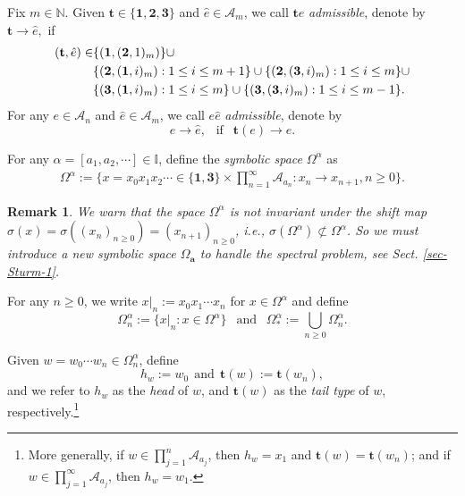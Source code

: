 \documentclass[reqno,11pt,graphicx,]{amsart}
\numberwithin{equation}{section}
\theoremstyle{plain}
\newcommand{\A}{{\mathscr A}}
\newcommand{\3}{\mathbf{3}}
\newcommand{\tT}{{\mathbf t}}
\newtheorem{remark}[theorem]{Remark}
\begin{document}
	Fix $m\in {\mathbb{N}}.$ Given ${\mathbf{t}}\in \{\mathbf{1},\mathbf{2},\mathbf{3}\}$ and $\hat e\in 
	\mathscr{A}_{m}$, we call ${\mathbf{t}}\hat e$ \textit{admissible}, denote
	by ${\mathbf{t}}\to \hat e,$ if 
	\begin{align}\label{admissible-T-A}
		({\mathbf{t}},\hat e)\in& \{(\mathbf{1},(\mathbf{2},1)_m)\}\cup  \notag \\
		&\{(\mathbf{2},(\mathbf{1},i)_m): 1\le i\le m+1\}\cup \{(\mathbf{2},(\mathbf{%
			3},i)_m): 1\le i\le m\}\cup \\
		&\{(\mathbf{3},(\mathbf{1},i)_m):1\le i\le m\}\cup \{(\mathbf{3},(\mathbf{3}%
		,i)_m):1\le i\le m-1\}.  \notag
	\end{align}
	For any $e\in{\mathscr A}_n$ and $\hat e\in {\mathscr A}_m$, we call $e\hat
	e $ \textit{admissible}, denote by 
	\begin{equation}\label{admissible-A-A}
		e\to \hat e, \ \ \text{ if }\ \ \mathbf{t}(e)\to \hat e.
	\end{equation}
	
	For any $\alpha=[a_1,a_2,\cdots]\in{\mathbb{I}}$, define the \textit{symbolic
		space} $\Omega^{\alpha}$  as 
	\begin{eqnarray}\label{Omega^alpha}
		\Omega^{\alpha}:=\Big\{x=x_0x_1x_2\cdots \in\{\mathbf{1},\mathbf{3}\}\times\prod_{n=1}^%
		\infty {\mathscr A}_{a_n}: x_n\to x_{n+1}, n\ge0 \Big\}.
	\end{eqnarray}
	\begin{remark}\label{invarint}
		We warn that the space $\Omega^{\alpha}$ is not invariant under the shift map $\sigma(x)=\sigma((x_n)_{n\geq0})=(x_{n+1})_{n\geq0}$, i.e., $\sigma(\Omega^{\alpha})\not\subset\Omega^{\alpha}$. So we must introduce a new symbolic space $\Omega_{\mathbf{a}}$ to handle the spectral problem, see Sect. \ref{sec-Sturm-1}.
	\end{remark}
	For any $n\geq0$, we write $x|_n:=x_0x_1\cdots x_n$ for $x\in\Omega^{\alpha}$ and define 
	\begin{equation*}  \label{def-Omega^alpha_n}
		\Omega^{\alpha}_{n}:=\{x|_n: x\in \Omega^{\alpha}\}\ \ \text{ and }\ \
		\Omega^{\alpha}_{\ast}:=\bigcup_{n\ge 0} \Omega^{\alpha}_{n}.
	\end{equation*}
	
	Given $w=w_0\cdots w_n\in \Omega^{\alpha}_{n}$, %
	define
	\begin{equation}\label{def-tail}
		h_w:=w_0 \ \ \text{and}\ \ \tT(w):=\tT(w_n), 
	\end{equation}
	and we refer to $h_{w}$ as the {\it head} of $w$, and $\tT(w)$
	as the {\it tail type} of $w$, respectively.\footnote{More generally, if $w\in \prod_{j=1}^n \A_{a_j}$, then $h_w=x_1$ and $\tT(w)=\tT(w_n)$; and 
		if $w\in \prod_{j=1}^\infty \A_{a_j}$, then $h_w=w_1$.}
	
\end{document}
